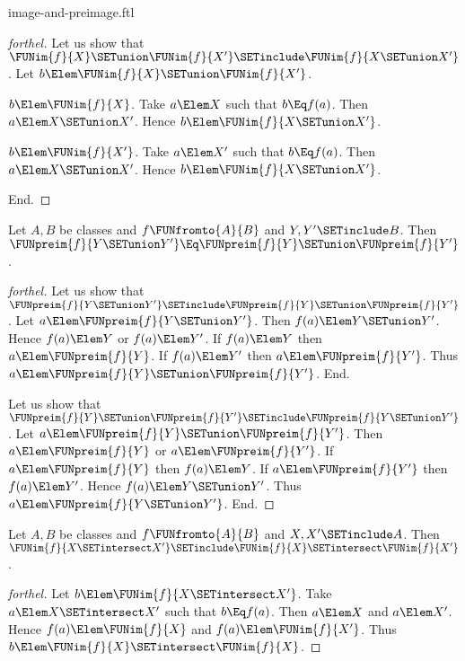 \documentclass{stex}
\begin{document}
\begin{smodule}{image-and-preimage.ftl}
\begin{proof}[forthel]
  Let us show that $\FUNim{f}{X} \SETunion \FUNim{f}{X'} \SETinclude \FUNim{f}{X \SETunion X'}$.
    Let $b \Elem \FUNim{f}{X} \SETunion \FUNim{f}{X'}$.

    \begin{case}{$b \Elem \FUNim{f}{X}$.}
      Take $a \Elem X$ such that $b \Eq f(a)$.
      Then $a \Elem X \SETunion X'$.
      Hence $b \Elem \FUNim{f}{X \SETunion X'}$.
    \end{case}

    \begin{case}{$b \Elem \FUNim{f}{X'}$.}
      Take $a \Elem X'$ such that $b \Eq f(a)$.
      Then $a \Elem X \SETunion X'$.
      Hence $b \Elem \FUNim{f}{X \SETunion X'}$.
    \end{case}
  End.
\end{proof}

\begin{proposition}[forthel]
  Let $A, B$ be classes and $f \FUNfromto{A}{B}$ and $Y, Y' \SETinclude B$.
  Then $\FUNpreim{f}{Y \SETunion Y'} \Eq \FUNpreim{f}{Y} \SETunion \FUNpreim{f}{Y'}$.
\end{proposition}
\begin{proof}[forthel]
  Let us show that $\FUNpreim{f}{Y \SETunion Y'} \SETinclude \FUNpreim{f}{Y} \SETunion \FUNpreim{f}{Y'}$.
    Let $a \Elem \FUNpreim{f}{Y \SETunion Y'}$.
    Then $f(a) \Elem Y \SETunion Y'$.
    Hence $f(a) \Elem Y$ or $f(a) \Elem Y'$.
    If $f(a) \Elem Y$ then $a \Elem \FUNpreim{f}{Y}$.
    If $f(a) \Elem Y'$ then $a \Elem \FUNpreim{f}{Y'}$.
    Thus $a \Elem \FUNpreim{f}{Y} \SETunion \FUNpreim{f}{Y'}$.
  End.

  Let us show that $\FUNpreim{f}{Y} \SETunion \FUNpreim{f}{Y'} \SETinclude \FUNpreim{f}{Y \SETunion Y'}$.
    Let $a \Elem \FUNpreim{f}{Y} \SETunion \FUNpreim{f}{Y'}$.
    Then $a \Elem \FUNpreim{f}{Y}$ or $a \Elem \FUNpreim{f}{Y'}$.
    If $a \Elem \FUNpreim{f}{Y}$ then $f(a) \Elem Y$.
    If $a \Elem \FUNpreim{f}{Y'}$ then $f(a) \Elem Y'$.
    Hence $f(a) \Elem Y \SETunion Y'$.
    Thus $a \Elem \FUNpreim{f}{Y \SETunion Y'}$.
  End.
\end{proof}

\begin{proposition}[forthel]
  Let $A, B$ be classes and $f \FUNfromto{A}{B}$ and $X, X' \SETinclude A$.
  Then $\FUNim{f}{X \SETintersect X'} \SETinclude \FUNim{f}{X} \SETintersect \FUNim{f}{X'}$.
\end{proposition}
\begin{proof}[forthel]
  Let $b \Elem \FUNim{f}{X \SETintersect X'}$.
  Take $a \Elem X \SETintersect X'$ such that $b \Eq f(a)$.
  Then $a \Elem X$ and $a \Elem X'$.
  Hence $f(a) \Elem \FUNim{f}{X}$ and $f(a) \Elem \FUNim{f}{X'}$.
  Thus $b \Elem \FUNim{f}{X} \SETintersect \FUNim{f}{X}$.
\end{proof}


\end{smodule}
\end{document}
